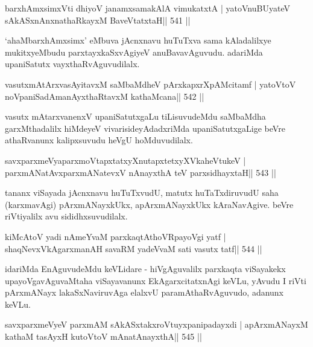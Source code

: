 
\begin{shl}
barxhAmxsimxVti dhiyoV janamxsamakAlA vimukatxtA |
yatoV\s nuBUyateV sAkASxnAnxnathaRkayxM BaveVtatxtaH\hfill || 541 ||
\end{shl}

\begin{artha}
`ahaMbarxhAmxsimx' eMbuva jAcnxnavu huTuTxva sama kAladalilxye   mukitxyeMbudu parxtayxkaSxvAgiyeV anuBavavAguvudu. adariMda   upaniSatutx vayxthaRvAguvudilalx.
\end{artha}

\begin{shl}
vasutxmAtArxvasAyitavxM saMbaMdheV pArxkapxrXpAMcitamf |
yatoV\s toV noVpaniSadAmanAyxthaRtavxM kathaMcana\hfill || 542 ||
\end{shl}

\begin{artha}
vasutx mAtarxvanenxV upaniSatutxgaLu tiLisuvudeMdu saMbaMdha garxMthadalilx hiMdeyeV vivarisideyAdadxriMda upaniSatutxgaLige beVre athaRvanunx kalipxsuvudu heVgU hoMduvudilalx.
\end{artha}



\begin{shl}
savxparxmeVyaparxmoVtapxtatxyXnutapxtetxyXVkaheVtukeV |
parxmANatAvxparxmANatevxV nAnayxthA teV parxsidhayxtaH\hfill || 543 ||
\end{shl}

\begin{artha}
tananx viSayada jAcnxnavu huTuTxvudU, matutx huTaTxdiruvudU saha (karxmavAgi) pArxmANayxkUkx, apArxmANayxkUkx kAraNavAgive. beVre riVtiyalilx avu sididhxsuvudilalx.
\end{artha}

\begin{shl}
kiMcAtoV yadi nAmeYvaM parxkaqtAthoVRpayoVgi yatf |
shaqNevxVkAgarxmanAH savaRM yadeVvaM sati vasutx tatf\hfill || 544 ||
\end{shl}

\begin{artha}
idariMda EnAguvudeMdu keVLidare - hiVgAguvalilx parxkaqta viSayakekx upayoVgavAguvaMtaha viSayavanunx EkAgarxcitatxnAgi keVLu, yAvudu I riVti pArxmANayx lakaSxNaviruvAga elalxvU paramAthaRvAguvudo, adanunx keVLu.
\end{artha}

\begin{shl}
savxparxmeVyeV parxmAM sAkASxtakxroVtuyxpanipadayxdi |
apArxmANayxM kathaM tasAyxH kutoV\s toV mAnatA\s nayxthA\hfill || 545 ||
\end{shl}

